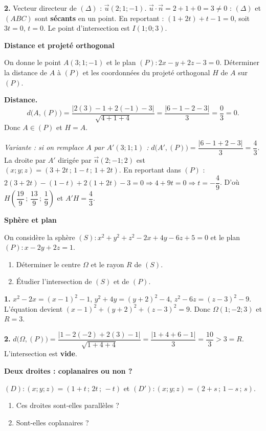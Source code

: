 \textbf{2.} Vecteur directeur de $(\Delta)$ : $\vec u(2;1;-1)$.
$\vec u \cdot \vec n = 2 + 1 + 0 = 3 \neq 0$ : $(\Delta)$ et $(ABC)$ sont
\textbf{sécants} en un point. En reportant : $(1 + 2t) + t - 1 = 0$, soit
$3t = 0$, $t = 0$. Le point d'intersection est $I(1;0;3)$.

\exerciceresolu
\textbf{Distance et projeté orthogonal}

On donne le point $A(3;1;-1)$ et le plan $(P) : 2x - y + 2z - 3 = 0$.
Déterminer la distance de $A$ à $(P)$ et les coordonnées du projeté orthogonal
$H$ de $A$ sur $(P)$.

\solution

\textbf{Distance.}
$$
d\bigl(A,(P)\bigr) = \frac{\left|2(3) - 1 + 2(-1) - 3\right|}{\sqrt{4 + 1 + 4}}
= \frac{\left|6 - 1 - 2 - 3\right|}{3} = \frac{0}{3} = 0.
$$
Donc $A \in (P)$ et $H = A$.

\medskip
\emph{Variante : si on remplace $A$ par $A'(3;1;1)$ :}
$d\bigl(A',(P)\bigr) = \dfrac{|6 - 1 + 2 - 3|}{3} = \dfrac{4}{3}$.
La droite par $A'$ dirigée par $\vec n(2;-1;2)$ est
$(x;y;z) = (3 + 2t\,;\,1 - t\,;\,1 + 2t)$. En reportant dans $(P)$ :
$2(3+2t) - (1 - t) + 2(1+2t) - 3 = 0 \Rightarrow 4 + 9t = 0 \Rightarrow t = -\dfrac{4}{9}$.
D'où $H\!\left(\dfrac{19}{9}\,;\,\dfrac{13}{9}\,;\,\dfrac{1}{9}\right)$
et $A'H = \dfrac{4}{3}$.

\exerciceresolu
\textbf{Sphère et plan}

On considère la sphère $(S) : x^2 + y^2 + z^2 - 2x + 4y - 6z + 5 = 0$ et le
plan $(P) : x - 2y + 2z = 1$.
\begin{enumerate}
	\item Déterminer le centre $\Omega$ et le rayon $R$ de $(S)$.
	\item Étudier l'intersection de $(S)$ et de $(P)$.
\end{enumerate}

\solution

\textbf{1.} $x^2 - 2x = (x-1)^2 - 1$, $y^2 + 4y = (y+2)^2 - 4$,
$z^2 - 6z = (z-3)^2 - 9$. L'équation devient
$(x-1)^2 + (y+2)^2 + (z-3)^2 = 9$.
Donc $\Omega(1;-2;3)$ et $R = 3$.

\textbf{2.} $d\bigl(\Omega,(P)\bigr)
= \dfrac{\left|1 - 2(-2) + 2(3) - 1\right|}{\sqrt{1 + 4 + 4}}
= \dfrac{\left|1 + 4 + 6 - 1\right|}{3} = \dfrac{10}{3} > 3 = R$.
L'intersection est \textbf{vide}.

\exerciceresolu
\textbf{Deux droites : coplanaires ou non ?}

$(D) : (x;y;z) = (1 + t\,;\,2t\,;\,-t)$ et
$(D') : (x;y;z) = (2 + s\,;\,1 - s\,;\,s)$.
\begin{enumerate}
	\item Ces droites sont-elles parallèles ?
	\item Sont-elles coplanaires ?
\end{enumerate}

